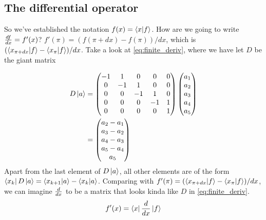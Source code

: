 \documentclass[12pt, oneside, letterpaper, fleqn]{article}
\begin{document}

\subsection{The differential operator}
So we've established the notation $f(x) = \left\langle x\middle\vert f\right\rangle$. How are we
going to write $\frac{d f}{dx} = f'(x)$? $f'(\pi) = (f(\pi+dx) - f(\pi))/dx$,
which is $(\left\langle x_{\pi+dx}\middle\vert f\right\rangle - \left\langle x_\pi\middle\vert f\right\rangle)/dx$. Take a look
at \eqref{eq:finite_deriv}, where we have let $D$ be the giant matrix

\begin{align}\begin{split}\label{eq:finite_deriv}
D \left\lvert a\right\rangle &=
\begin{pmatrix}
-1 & 1 & 0 & 0 & 0\\
0 & -1 & 1 & 0 & 0\\
0 & 0 & -1 & 1 & 0\\
0 & 0 & 0 & -1 & 1\\
0 & 0 & 0 & 0 & 1\\
\end{pmatrix}
\begin{pmatrix}
a_1\\
a_2\\
a_3\\
a_4\\
a_5
\end{pmatrix}\\
&=
\begin{pmatrix}
a_2 - a_1\\
a_3 - a_2\\
a_4 - a_3\\
a_5 - a_4\\
a_5
\end{pmatrix}
\end{split}\end{align}
Apart from the last element of $D\left\lvert a\right\rangle$, all other elements are of
the form $\left\langle x_k\right\rvert D\left\lvert a\right\rangle = \left\langle x_{k+1}\middle\vert a\right\rangle - \left\langle x_k\middle\vert a\right\rangle$.
Comparing with $f'(\pi) = (\left\langle x_{\pi+dx}\middle\vert f\right\rangle -
\left\langle x_\pi\middle\vert f\right\rangle)/dx$, we can imagine $\frac{d }{dx}$ to be a matrix
that looks kinda like $D$ in \eqref{eq:finite_deriv}.
\begin{align}
f'(x) = \left\langle x\right\rvert\frac{d }{dx}\left\lvert f\right\rangle
\end{align}
\end{document}
